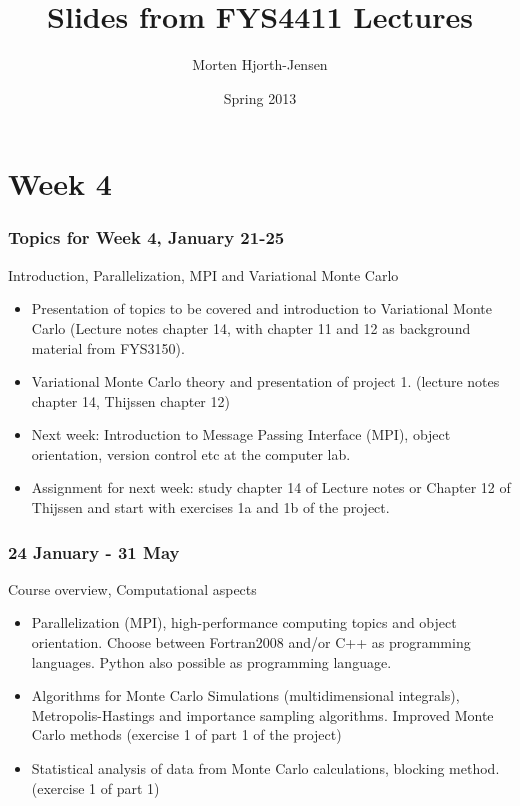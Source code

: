 \documentclass[compress]{beamer}
\title[FYS4411]{Slides from FYS4411 Lectures}
\author[Computational Physics II]{%
  Morten Hjorth-Jensen}
\institute[ORNL, University of Oslo and MSU]{
  \inst{1}
  Department of Physics and Center of Mathematics for Applications\\
  University of Oslo, N-0316 Oslo, Norway}
\date[UiO]{Spring  2013}
\begin{document}
\frame{\titlepage}




\section[Week 4]{Week 4}
\frame
{
  \frametitle{Topics for Week 4, January 21-25}
  \begin{block}{Introduction, Parallelization, MPI and Variational Monte Carlo}
\begin{itemize}
\item Presentation of topics to be covered and introduction to Variational Monte Carlo (Lecture notes chapter 14, with chapter 11 and 12 as background material from FYS3150).
\item Variational Monte Carlo theory and presentation of project 1. (lecture notes chapter 14, Thijssen chapter 12) 
\item Next week: Introduction to Message Passing Interface (MPI), object orientation, version control etc at the computer lab.
\item Assignment for next week: study chapter 14 of Lecture notes or Chapter 12 of Thijssen and start with exercises 1a and 1b of the project.
\end{itemize}
  \end{block}
} 




\frame
{
  \frametitle{24 January - 31  May}
  \begin{block}{Course overview, Computational aspects}
\begin{itemize}
\item Parallelization (MPI), high-performance computing topics and object orientation. Choose
between Fortran2008 and/or C++ as programming languages. Python also possible as programming language. 
\item Algorithms for Monte Carlo Simulations (multidimensional integrals), Metropolis-Hastings and importance sampling
algorithms. 
Improved Monte Carlo methods (exercise 1 of part 1 of the project)
\item Statistical analysis of data  from Monte Carlo calculations, blocking method. (exercise 1 of part 1)
\end{itemize}
  \end{block}
} 
\end{document}
